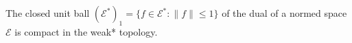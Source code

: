 The closed unit ball $(\mathcal{E}^*)_1 = \{f \in \mathcal{E}^* : \|f\| \leq 1\}$ of the dual of a normed space $\mathcal{E}$ is compact in the weak* topology.
